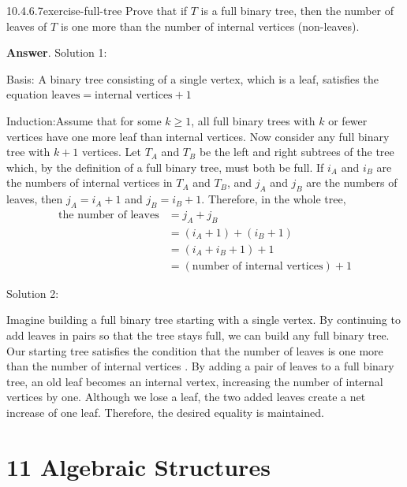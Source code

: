 \documentclass[twoside,10pt,]{book}
\numberwithin{equation}{section}
\begin{document}
\begin{divisionsolution}{10.4.6.7}{}{exercise-full-tree}%
\hypertarget{p-3754}{}%
Prove that if \(T\) is a full binary tree, then the number of leaves of \(T\) is one more than the number of internal vertices (non-leaves).%
\par\smallskip%
\noindent\textbf{Answer}.\quad%
\hypertarget{p-3755}{}%
Solution 1:%
\par
\hypertarget{p-3756}{}%
Basis: A binary tree consisting of a single vertex, which is a leaf, satisfies the equation \(\text{leaves} = \textrm{internal vertices} + 1\)%
\par
\hypertarget{p-3757}{}%
Induction:Assume that for some \(k\geq 1\), all full binary trees with \(k\) or fewer vertices have one more leaf than internal vertices. Now consider any full binary tree with \(k+1\) vertices. Let \(T_A\) and \(T_B\) be the left and right subtrees of the tree which, by the definition of a full binary tree, must both be full. If \(i_A\) and \(i_B\) are the numbers of internal vertices in \(T_A\) and \(T_B\), and \(j_A\) and \(j_B\) are the numbers of leaves, then \(j_A=i_A+1 \) and \(j_B=i_B+1\). Therefore, in the whole tree,%
\begin{equation*}
\begin{split}
\textrm{the number of leaves} & =j_A+j_B\\
&=\left(i_A+1\right)+\left(i_B+1\right)\\
&=\left(i_A+i_B+1\right)+1\\
&=(\textrm{number of internal vertices})+1
\end{split}
\end{equation*}
%
\par
\hypertarget{p-3758}{}%
Solution 2:%
\par
\hypertarget{p-3759}{}%
Imagine building a full binary tree starting with a single vertex. By continuing to add leaves in pairs so that the tree stays full, we can build any full binary tree. Our starting tree satisfies the condition that the number of leaves is one more than the number of internal vertices . By adding a pair of leaves to a full binary tree, an old leaf becomes an internal vertex, increasing the number of internal vertices by one. Although we lose a leaf, the two added leaves create a net increase of one leaf. Therefore, the desired equality is maintained.%
\end{divisionsolution}%
\chapter*{11 Algebraic Structures}
\end{document}
